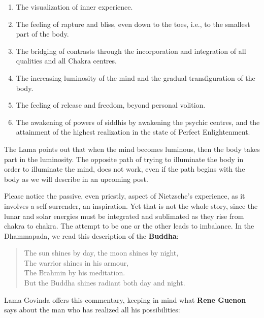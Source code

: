 \begin{enumerate}
\item The visualization of inner experience.

\item The feeling of rapture and bliss, even down to the toes, i.e., to the smallest part of the body.

\item The bridging of contrasts through the incorporation and integration of all qualities and all Chakra centres.

\item The increasing luminosity of the mind and the gradual transfiguration of the body.

\item The feeling of release and freedom, beyond personal volition.

\item The awakening of powers of siddhis by awakening the psychic centres, and the attainment of the highest realization in the state of Perfect Enlightenment.
\end{enumerate}


The Lama points out that when the mind becomes luminous, then the body takes part in the luminosity. The opposite path of trying to illuminate the body in order to illuminate the mind, does not work, even if the path begins with the body as we will describe in an upcoming post.

Please notice the passive, even priestly, aspect of Nietzsche's experience, as it involves a self-surrender, an inspiration. Yet that is not the whole story, since the lunar and solar energies must be integrated and sublimated as they rise from chakra to chakra. The attempt to be one or the other leads to imbalance. In the Dhammapada, we read this description of the \textbf{Buddha}:

\begin{quotex}
\begin{verse}
The sun shines by day, the moon shines by night,\\
The warrior shines in his armour,\\
The Brahmin by his meditation.\\
But the Buddha shines radiant both day and night.
\end{verse}
\end{quotex}


Lama Govinda offers this commentary, keeping in mind what \textbf{Rene Guenon} says about the man who has realized all his possibilities:

